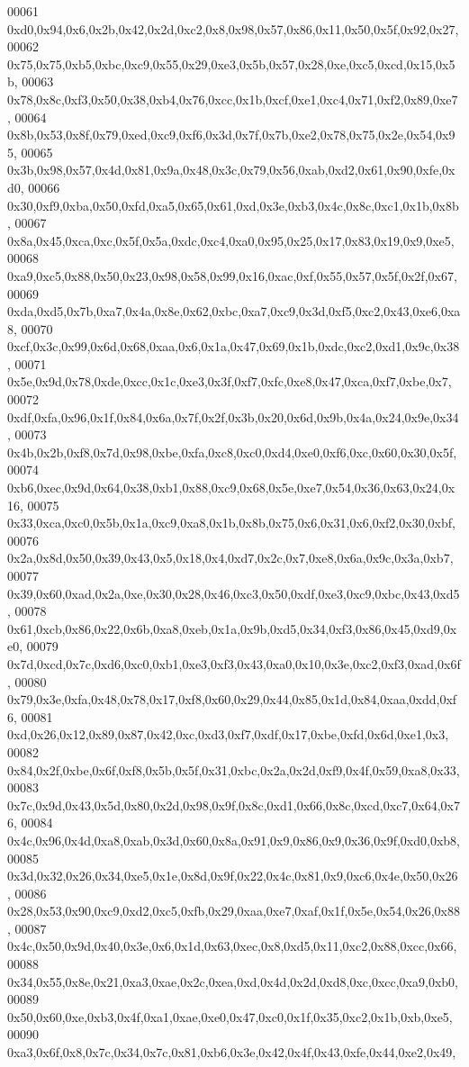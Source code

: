 \begin{DoxyCode}
00061   0xd0,0x94,0x6,0x2b,0x42,0x2d,0xc2,0x8,0x98,0x57,0x86,0x11,0x50,0x5f,0x92,0x27,
00062   0x75,0x75,0xb5,0xbc,0xc9,0x55,0x29,0xe3,0x5b,0x57,0x28,0xe,0xc5,0xcd,0x15,0x5b,
00063   0x78,0x8c,0xf3,0x50,0x38,0xb4,0x76,0xcc,0x1b,0xcf,0xe1,0xc4,0x71,0xf2,0x89,0xe7,
00064   0x8b,0x53,0x8f,0x79,0xed,0xc9,0xf6,0x3d,0x7f,0x7b,0xe2,0x78,0x75,0x2e,0x54,0x95,
00065   0x3b,0x98,0x57,0x4d,0x81,0x9a,0x48,0x3c,0x79,0x56,0xab,0xd2,0x61,0x90,0xfe,0xd0,
00066   0x30,0xf9,0xba,0x50,0xfd,0xa5,0x65,0x61,0xd,0x3e,0xb3,0x4c,0x8c,0xc1,0x1b,0x8b,
00067   0x8a,0x45,0xca,0xc,0x5f,0x5a,0xdc,0xc4,0xa0,0x95,0x25,0x17,0x83,0x19,0x9,0xe5,
00068   0xa9,0xc5,0x88,0x50,0x23,0x98,0x58,0x99,0x16,0xac,0xf,0x55,0x57,0x5f,0x2f,0x67,
00069   0xda,0xd5,0x7b,0xa7,0x4a,0x8e,0x62,0xbc,0xa7,0xc9,0x3d,0xf5,0xc2,0x43,0xe6,0xa8,
00070   0xcf,0x3c,0x99,0x6d,0x68,0xaa,0x6,0x1a,0x47,0x69,0x1b,0xdc,0xc2,0xd1,0x9c,0x38,
00071   0x5e,0x9d,0x78,0xde,0xcc,0x1c,0xe3,0x3f,0xf7,0xfc,0xe8,0x47,0xca,0xf7,0xbe,0x7,
00072   0xdf,0xfa,0x96,0x1f,0x84,0x6a,0x7f,0x2f,0x3b,0x20,0x6d,0x9b,0x4a,0x24,0x9e,0x34,
00073   0x4b,0x2b,0xf8,0x7d,0x98,0xbe,0xfa,0xc8,0xc0,0xd4,0xe0,0xf6,0xc,0x60,0x30,0x5f,
00074   0xb6,0xec,0x9d,0x64,0x38,0xb1,0x88,0xc9,0x68,0x5e,0xe7,0x54,0x36,0x63,0x24,0x16,
00075   0x33,0xca,0xc0,0x5b,0x1a,0xc9,0xa8,0x1b,0x8b,0x75,0x6,0x31,0x6,0xf2,0x30,0xbf,
00076   0x2a,0x8d,0x50,0x39,0x43,0x5,0x18,0x4,0xd7,0x2c,0x7,0xe8,0x6a,0x9c,0x3a,0xb7,
00077   0x39,0x60,0xad,0x2a,0xe,0x30,0x28,0x46,0xc3,0x50,0xdf,0xe3,0xc9,0xbc,0x43,0xd5,
00078   0x61,0xcb,0x86,0x22,0x6b,0xa8,0xeb,0x1a,0x9b,0xd5,0x34,0xf3,0x86,0x45,0xd9,0xe0,
00079   0x7d,0xcd,0x7c,0xd6,0xc0,0xb1,0xe3,0xf3,0x43,0xa0,0x10,0x3e,0xc2,0xf3,0xad,0x6f,
00080   0x79,0x3e,0xfa,0x48,0x78,0x17,0xf8,0x60,0x29,0x44,0x85,0x1d,0x84,0xaa,0xdd,0xf6,
00081   0xd,0x26,0x12,0x89,0x87,0x42,0xc,0xd3,0xf7,0xdf,0x17,0xbe,0xfd,0x6d,0xe1,0x3,
00082   0x84,0x2f,0xbe,0x6f,0xf8,0x5b,0x5f,0x31,0xbc,0x2a,0x2d,0xf9,0x4f,0x59,0xa8,0x33,
00083   0x7c,0x9d,0x43,0x5d,0x80,0x2d,0x98,0x9f,0x8c,0xd1,0x66,0x8c,0xcd,0xc7,0x64,0x76,
00084   0x4c,0x96,0x4d,0xa8,0xab,0x3d,0x60,0x8a,0x91,0x9,0x86,0x9,0x36,0x9f,0xd0,0xb8,
00085   0x3d,0x32,0x26,0x34,0xe5,0x1e,0x8d,0x9f,0x22,0x4c,0x81,0x9,0xc6,0x4e,0x50,0x26,
00086   0x28,0x53,0x90,0xc9,0xd2,0xc5,0xfb,0x29,0xaa,0xe7,0xaf,0x1f,0x5e,0x54,0x26,0x88,
00087   0x4c,0x50,0x9d,0x40,0x3e,0x6,0x1d,0x63,0xec,0x8,0xd5,0x11,0xc2,0x88,0xcc,0x66,
00088   0x34,0x55,0x8e,0x21,0xa3,0xae,0x2c,0xea,0xd,0x4d,0x2d,0xd8,0xc,0xcc,0xa9,0xb0,
00089   0x50,0x60,0xe,0xb3,0x4f,0xa1,0xae,0xe0,0x47,0xc0,0x1f,0x35,0xc2,0x1b,0xb,0xe5,
00090   0xa3,0x6f,0x8,0x7c,0x34,0x7c,0x81,0xb6,0x3e,0x42,0x4f,0x43,0xfe,0x44,0xe2,0x49,

\end{DoxyCode}
